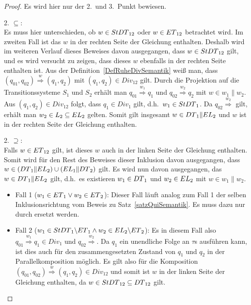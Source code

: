 \begin{proof} Es wird hier nur der 2.\ und 3.\ Punkt bewiesen.

  2. \glqq{}$\subseteq$\grqq{}:\\
  Es muss hier unterschieden, ob $w\in StDT{}_{12}$ oder $w\in ET{}_{12}$
  betrachtet wird. Im zweiten Fall ist das $w$ in der rechten Seite der
  Gleichung enthalten. Deshalb wird im weiteren Verlauf dieses Beweises davon
  ausgegangen, dass $w\in StDT{}_{12}$ gilt, und es wird versucht zu
  zeigen, dass dieses $w$ ebenfalls in der rechten Seite enthalten ist. Aus der
  Definition~\ref{DefRuheDivSemantik} weiß man, dass $(q_{01},q_{02})
  \overset{w}{\Rightarrow} (q_1,q_2)$ mit $(q_1,q_2)\in Div_{12}$ gilt. Durch
  die Projektion auf die Transitionssysteme $S_1$ und $S_2$ erhält man $q_{01}
  \overset{w_1}{\Rightarrow} q_1$ und $q_{02} \overset{w_2}{\Rightarrow} q_2$
  mit $w\in w_1\|w_2$. Aus $(q_1,q_2)\in Div_{12}$ folgt, dass \oBdA{} $q_1\in
  Div_1$ gilt, d.h.\ $w_1\in StDT{}_1$. Da $q_{02} \overset{w_2}{\Rightarrow}$
  gilt, erhält man $w_2\in L_2\subseteq EL{}_2$ gelten. Somit gilt insgesamt
  $w\in DT{}_1\|EL{}_2$ und $w$ ist in der rechten Seite der Gleichung
  enthalten.

  2. \glqq{}$\supseteq$\grqq{}:\\
  Falls $w\in ET{}_{12}$ gilt, ist dieses $w$ auch in der linken Seite der
  Gleichung enthalten. Somit wird für den Rest des Beweises dieser Inklusion
  davon ausgegangen, dass $w\in(DT{}_1\|EL{}_2)\cup (EL{}_1\|DT{}_2)$ gilt.
  Es wird nun davon ausgegangen, das \oBdA{} $w\in DT{}_1\|EL{}_2$ gilt,
  d.h.\ es existieren $w_1\in DT{}_1$ und $w_2\in EL{}_2$ mit $w\in
  w_1\|w_2$.
  \begin{itemize}
    \item Fall 1 ($w_1\in ET{}_1 \vee w_2\in ET{}_2$): Dieser Fall läuft
      analog zum Fall 1 der selben Inklusionsrichtung vom Beweis zu
      Satz~\ref{satzQuiSemantik}. Es muss dazu nur \StQT{} durch \StDT{}
      ersetzt werden.
    \item Fall 2 ($w_1\in StDT{}_1\backslash ET{}_1 \wedge w_2\in
      EL{}_2\backslash ET{}_2$): Es in diesem Fall also $q_{01}
      \overset{w_1}{\Rightarrow} q_1\in Div_1$ und $q_{02}
      \overset{w_2}{\Rightarrow}$. Da $q_1$ ein unendliche Folge an $\tau$s
      ausführen kann, ist dies auch für den zusammengesetzten Zustand von $q_1$
      und $q_2$ in der Parallelkomposition möglich. Es gilt also für die
      Komposition $(q_{01},q_{02}) \overset{w}{\Rightarrow} (q_1,q_2)\in
      Div_{12}$ und somit ist $w$ in der linken Seite der Gleichung enthalten,
      da $w\in StDT{}_{12}\subseteq DT{}_{12}$ gilt.
  \end{itemize}


\end{proof}
